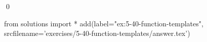 
\begin{ex}
  \label{ex:5-40-function-templates}
  
  \qed
\end{ex}
\begin{python0}
from solutions import *
add(label="ex:5-40-function-templates",
    srcfilename='exercises/5-40-function-templates/answer.tex')
\end{python0}
